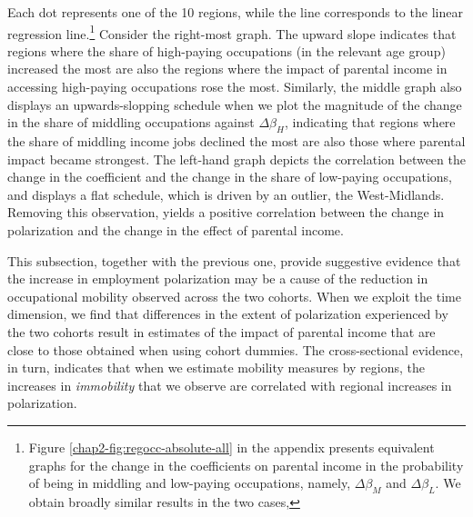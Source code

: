 Each dot represents one of the 10 regions, while the line corresponds to the linear regression line.\footnote{Figure \ref{chap2-fig:regocc-absolute-all} in the appendix presents equivalent graphs for the change in the coefficients on parental income in the probability of being in middling and low-paying occupations, namely, $\Delta\beta_{M}$ and $\Delta\beta_{L}$. We obtain broadly similar results in the two cases,} Consider the right-most graph. The upward slope indicates that regions where the share of high-paying occupations (in the relevant age group) increased the most are also the regions where the impact of parental income in accessing high-paying occupations rose the most. Similarly, the middle graph also displays an upwards-slopping schedule when we plot the magnitude of the change in the share of middling occupations against $\Delta\beta_{H}$, indicating that regions where the share of middling income jobs declined the most are also those where parental impact became strongest. The left-hand graph depicts the correlation between the change in the coefficient and the change in the share of low-paying occupations, and displays a flat schedule, which is driven by an outlier, the West-Midlands. Removing this observation, yields a positive correlation between the change in polarization and the change in the effect of parental income.

This subsection, together with the previous one, provide suggestive evidence that the increase in employment polarization may be a cause of the reduction in occupational mobility observed across the two cohorts. When we exploit the time dimension, we find that differences in the extent of polarization experienced by the two cohorts result in estimates of the impact of parental income that are close to those obtained when using cohort dummies. The cross-sectional evidence, in turn, indicates that when we estimate mobility measures by regions, the increases in \emph{immobility} that we observe are correlated with regional increases in polarization.




